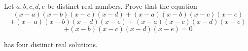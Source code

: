 Let $a, b, c, d, e$ be distinct real numbers. Prove that the equation\[(x - a)(x - b)(x - c)(x - d) + (x - a)(x - b)(x - c)(x - e)\]\[+(x - a)(x - b)(x - d)(x - e) + (x - a)(x - c)(x - d)(x - e)\]\[+(x - b)(x - c)(x - d)(x - e) = 0\]

has four distinct real solutions.